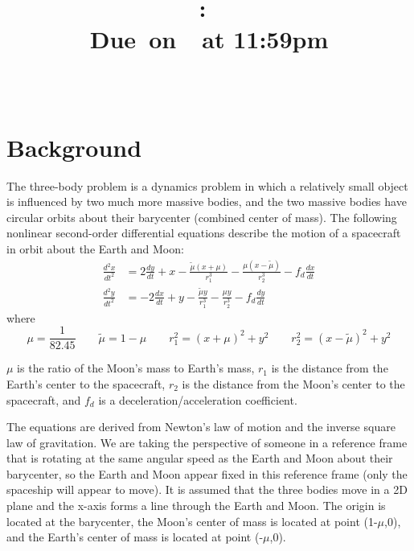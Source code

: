 \documentclass{article}
\title{
    \vspace{2in}
    \textmd{\textbf{\hmwkClass:\ \hmwkTitle}}\\
    \normalsize\vspace{0.1in}\small{Due\ on\ \hmwkDueDate\ at 11:59pm}\\
    \vspace{0.1in}\large{\textit{\hmwkClassInstructor\ \hmwkClassTime}}
    \vspace{3in}
}
\author{\hmwkAuthorName}
\date{}
\newcommand{\deriv}[2]{\frac{d#1}{d#2}}
\begin{document}
\color{white}

\maketitle

\pagebreak


\section{Background}

The \color{magenta} three-body problem \color{white} is a dynamics problem in which a relatively small object is influenced by two much more massive bodies, and the two massive bodies have circular orbits about their barycenter (combined center of mass). The following nonlinear second-order differential equations describe the motion of a spacecraft in orbit about the Earth and Moon:
\color{cyan}
\begin{align}
    \deriv{^2 x}{t^2} & = 2\deriv{y}{t} + x - \frac{\tilde{\mu} \left(x+\mu\right)}{r_1^3} - \frac{\mu \left(x-\tilde{\mu}\right)}{r_2^3} - f_d \deriv{x}{t}
    \label{eq:ODE1}                                                                                                                                          \\
    \deriv{^2 y}{t^2} & = -2\deriv{x}{t} + y - \frac{\tilde{\mu}y}{r_1^3} - \frac{\mu y}{r_2^3} - f_d\deriv{y}{t}
    \label{eq:ODE2}
\end{align}
\color{white} where
\color{orange}
\begin{equation*}
    \mu = \frac{1}{82.45} \qquad \tilde{\mu} = 1 - \mu \qquad r_1^2 = \left(x+\mu\right)^2 + y^2 \qquad r_2^2 = \left(x-\tilde{\mu}\right)^2 + y^2
\end{equation*}

\color{white}

$\mu$ is the ratio of the Moon's mass to Earth's mass, $r_1$ is the distance from the Earth’s center to the
spacecraft, $r_2$ is the distance from the Moon’s center to the spacecraft, and $f_d$ is a deceleration/acceleration
coefficient.

\vspace{\baselineskip}

The equations are derived from Newton’s law of motion and the inverse square law of gravitation. We are taking the perspective of someone in a reference frame that is rotating at the same angular speed as the Earth and Moon about their barycenter, so the Earth and Moon appear fixed in this reference frame (only the spaceship will appear to move). It is assumed that the three bodies move in a 2D plane and the x-axis forms a line through the Earth and Moon. The origin is located at the barycenter, the Moon’s center of mass is located at point (1-$\mu$,0), and the Earth’s center of mass is located at point (-$\mu$,0).
\end{document}
